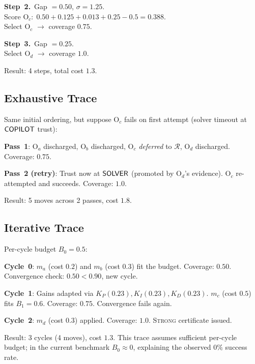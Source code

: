 \documentclass[11pt]{article}
\newcommand{\vint}{\sigma}                 %
\newcommand{\Kp}{K_P}                      %
\newcommand{\Ki}{K_I}                      %
\newcommand{\Kd}{K_D}                      %
\begin{document}
\smallskip\noindent
\textbf{Step~2.}\ Gap $= 0.50$, $\vint = 1.25$. \\
Score $\mathrm{O}_c{:}\; 0.50 + 0.125 + 0.013 + 0.25 - 0.5 = 0.388$. \\
Select $\mathrm{O}_c$ $\to$ coverage $0.75$.

\smallskip\noindent
\textbf{Step~3.}\ Gap $= 0.25$. \\
Select $\mathrm{O}_d$ $\to$ coverage $1.0$.

\medskip\noindent
Result: 4 steps, total cost $1.3$.

\subsection{Exhaustive Trace}

Same initial ordering, but suppose $\mathrm{O}_c$ fails on first
attempt (solver timeout at $\mathsf{COPILOT}$ trust):

\medskip\noindent
\textbf{Pass~1}: $\mathrm{O}_a$ discharged, $\mathrm{O}_b$ discharged,
$\mathrm{O}_c$ \emph{deferred} to $\mathcal{R}$, $\mathrm{O}_d$
discharged.  Coverage: $0.75$.

\smallskip\noindent
\textbf{Pass~2 (retry)}: Trust now at $\mathsf{SOLVER}$ (promoted by
$\mathrm{O}_d$'s evidence).  $\mathrm{O}_c$ re-attempted and
succeeds.  Coverage: $1.0$.

\medskip\noindent
Result: 5 moves across 2 passes, cost $1.8$.

\subsection{Iterative Trace}

Per-cycle budget $B_0 = 0.5$:

\medskip\noindent
\textbf{Cycle~0}: $m_a$ (cost $0.2$) and $m_b$ (cost $0.3$) fit the
budget.  Coverage: $0.50$.  Convergence check:
$0.50 < 0.90$, new cycle.

\smallskip\noindent
\textbf{Cycle~1}: Gains adapted via $\Kp(0.23), \Ki(0.23), \Kd(0.23)$.
$m_c$ (cost $0.5$) fits $B_1 = 0.6$.  Coverage: $0.75$.
Convergence fails again.

\smallskip\noindent
\textbf{Cycle~2}: $m_d$ (cost $0.3$) applied.  Coverage: $1.0$.
\textsc{Strong} certificate issued.

\medskip\noindent
Result: 3 cycles (4 moves), cost $1.3$.  This trace assumes sufficient
per-cycle budget; in the current benchmark $B_0 \approx 0$,
explaining the observed $0\%$ success rate.
\end{document}
